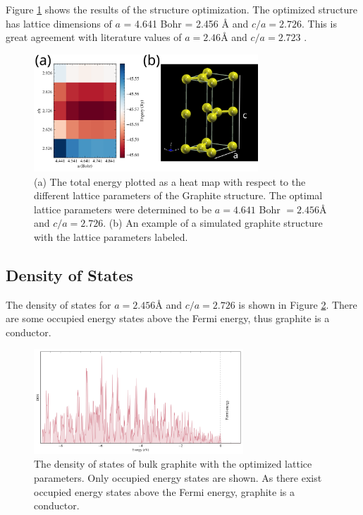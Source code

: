 \documentclass[10pt,a4paper]{labreport}
\begin{document}

Figure \ref{fig:ass4_structopt} shows the results of the structure optimization. The optimized structure has lattice dimensions of $a$ = 4.641 Bohr = 2.456 {\AA} and $c/a = 2.726$. This is great agreement with literature values of $a=2.46${\AA} and $c/a = 2.723$ \cite{hembacherRevealingHiddenAtom2003}. 

\begin{figure}[h]
    \centering 
    \includegraphics[width = 0.75\textwidth]{figs/ass4_structopt.png}
    \caption{ (a) The total energy plotted as a heat map with respect to the different lattice parameters of the Graphite structure. The
            optimal lattice parameters were determined to be $a = 4.641$ Bohr $=2.456${\AA} and $c/a = 2.726$. (b) An example of a simulated graphite structure with the lattice parameters labeled. }
    \label{fig:ass4_structopt}
\end{figure}

\newpage
\subsection{Density of States}
The density of states for $a=2.456${\AA} and $c/a = 2.726$ is shown in Figure \ref{fig:ass4_dos}. There are some occupied energy states above the Fermi energy, thus graphite is a conductor. 

\begin{figure}[h]
    \centering 
    \includegraphics[width = 0.7\textwidth]{figs/ass4_dos.png}
    \caption{ The density of states of bulk graphite with the optimized lattice parameters. Only occupied energy states are shown. As there exist occupied energy states above the Fermi energy, graphite is a conductor. }
    \label{fig:ass4_dos}
\end{figure}
\end{document}
